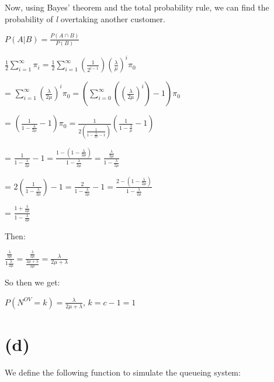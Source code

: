 \documentclass[]{article}
\begin{document}
Now, using Bayes' theorem and the total probability rule, we can find
the probability of \emph{l} overtaking another customer.

\(P(A | B) = \frac{P(A \cap B)}{P(B)}\)

\(\frac{1}{2} \sum_{i=1}^{\infty} \pi_i = \frac{1}{2} \sum_{i=1}^{\infty} (\frac{1}{2^{i-1}}) (\frac{\lambda}{\mu})^{i} \pi_0\)

=
\(\sum_{i=1}^{\infty} (\frac{\lambda}{2 \mu})^i \pi_0 = (\sum_{i=0}^{\infty} ((\frac{\lambda}{2 \mu})^i) - 1) \pi_0\)

=
\((\frac{1}{1-\frac{\lambda}{2 \mu}} - 1) \pi_0 = \frac{1}{2 (\frac{1}{1 - \frac{\lambda}{2 \mu} - 1})} (\frac{1}{1 - \frac{\lambda}{\mu}} - 1)\)

=
\(\frac{1}{1 - \frac{\lambda}{2 \mu}} - 1 = \frac{1 - (1 - \frac{\lambda}{2 \mu})}{1 - \frac{\lambda}{2 \mu}} = \frac{\frac{\lambda}{2 \mu}}{1 - \frac{\lambda}{2 \mu}}\)

=
\(2 (\frac{1}{1 - \frac{\lambda}{2 \mu}}) - 1 = \frac{2}{1 - \frac{\lambda}{2 \mu}} - 1 = \frac{2 - (1 - \frac{\lambda}{2 \mu})}{1 - \frac{\lambda}{2 \mu}}\)

= \(\frac{1 + \frac{\lambda}{2 \mu}}{1 - \frac{\lambda}{2 \mu}}\)

Then:

\(\frac{\frac{\lambda}{2 \mu}}{1 \frac{\lambda}{2 \mu}} = \frac{\frac{\lambda}{2 \mu}}{\frac{2 \mu + \lambda}{2 \mu}} = \frac{\lambda}{2 \mu + \lambda}\)

So then we get:

\(P(N^{OV} = k) = \frac{\lambda}{2 \mu + \lambda}\), \(k = c-1 = 1\)

\hypertarget{d-1}{%
\section{(d)}\label{d-1}}

We define the following function to simulate the queueing system:
\end{document}
